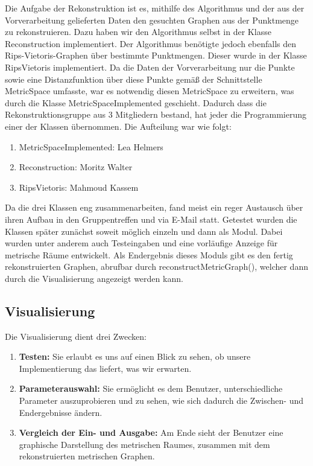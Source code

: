 \documentclass[parskip=half,
 fontsize=12pt, bibtotoc,
 ngerman]
 {article}
\begin{document}
Die Aufgabe der Rekonstruktion ist es, mithilfe des Algorithmus und der aus der Vorverarbeitung gelieferten Daten den gesuchten Graphen aus der Punktmenge zu rekonstruieren. Dazu haben wir den Algorithmus selbst in der Klasse Reconstruction implementiert. Der Algorithmus benötigte jedoch ebenfalls den Rips-Vietoris-Graphen über bestimmte Punktmengen. Dieser wurde in der Klasse RipsVietoris implementiert. Da die Daten der Vorverarbeitung nur die Punkte sowie eine Distanzfunktion über diese Punkte gemäß der Schnittstelle MetricSpace umfasste, war es notwendig diesen MetricSpace zu erweitern, was durch die Klasse MetricSpaceImplemented geschieht. Dadurch dass die Rekonstruktionsgruppe aus 3 Mitgliedern bestand, hat jeder die Programmierung einer der Klassen übernommen. Die Aufteilung war wie folgt:

\begin{enumerate}
\item MetricSpaceImplemented: Lea Helmers
\item Reconstruction: Moritz Walter
\item RipsVietoris: Mahmoud Kassem
\end{enumerate}

Da die drei Klassen eng zusammenarbeiten, fand meist ein reger Austausch über ihren Aufbau in den Gruppentreffen und via E-Mail statt. Getestet wurden die Klassen später zunächst soweit möglich einzeln und dann als Modul. Dabei wurden unter anderem auch Testeingaben und eine vorläufige Anzeige für metrische Räume entwickelt. Als Endergebnis dieses Moduls gibt es den fertig rekonstruierten Graphen, abrufbar durch reconstructMetricGraph(), welcher dann durch die Visualisierung angezeigt werden kann.

\subsection{Visualisierung}

Die Visualisierung dient drei Zwecken:

\begin{enumerate}
\item \textbf{Testen:} Sie erlaubt es uns auf einen Blick zu sehen, ob unsere Implementierung das liefert, was wir erwarten.
\item \textbf{Parameterauswahl:} Sie ermöglicht es dem Benutzer, unterschiedliche Parameter auszuprobieren und zu sehen, wie sich dadurch die Zwischen- und Endergebnisse ändern.
\item \textbf{Vergleich der Ein- und Ausgabe:} Am Ende sieht der Benutzer eine graphische Darstellung des metrischen Raumes, zusammen mit dem rekonstruierten metrischen Graphen.
\end{enumerate}
\end{document}
